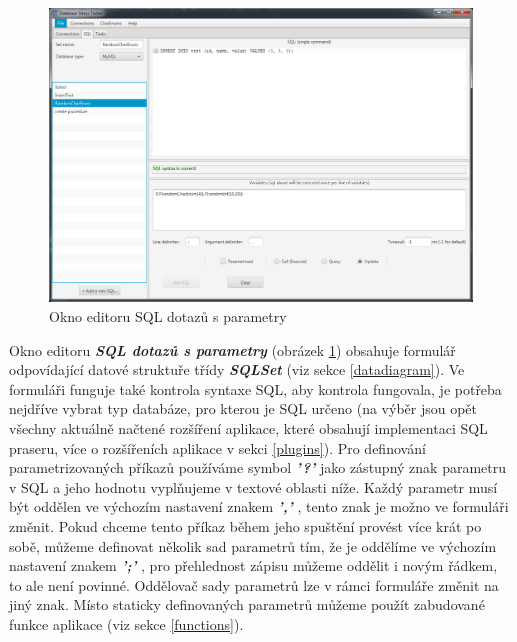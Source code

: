 \documentclass[czech,bachelor,public,dept460,male,cpdeclaration,twoside]{diploma}
\begin{document}
\newpage
\begin{figure}[!htbp]\centering\includegraphics[width=1.0\textwidth]{Figures/sqleditor.png}\caption{Okno editoru SQL dotazů s parametry}
\label{sqleditor}
\end{figure}
Okno editoru \textbf{\emph{SQL dotazů s parametry}} (obrázek \ref{sqleditor}) obsahuje formulář odpovídající datové struktuře třídy \textbf{\emph{SQLSet}} (viz sekce \ref{datadiagram}). Ve formuláři funguje také kontrola syntaxe SQL, aby kontrola fungovala, je potřeba nejdříve vybrat typ databáze, pro kterou je SQL určeno (na výběr jsou opět všechny aktuálně načtené rozšíření aplikace, které obsahují implementaci SQL praseru, více o rozšířeních aplikace v sekci \ref{plugins}). Pro definování parametrizovaných příkazů používáme symbol \textbf{\emph{ '?' }} jako zástupný znak parametru v SQL a jeho hodnotu vyplňujeme v textové oblasti níže. Každý parametr musí být oddělen ve výchozím nastavení znakem \textbf{\emph{ ',' }}, tento znak je možno ve formuláři změnit. Pokud chceme tento příkaz během jeho spuštění provést více krát po sobě, můžeme definovat několik sad parametrů tím, že je oddělíme ve výchozím nastavení znakem \textbf{\emph{ ';' }}, pro přehlednost zápisu můžeme oddělit i novým řádkem, to ale není povinné. Oddělovač sady parametrů lze v rámci formuláře změnit na jiný znak. Místo staticky definovaných parametrů můžeme použít zabudované funkce aplikace (viz sekce \ref{functions}).
\end{document}
